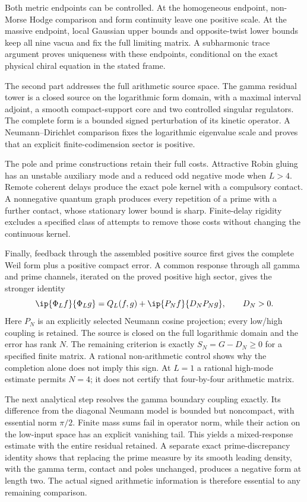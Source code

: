 Both metric endpoints can be controlled. At the homogeneous
endpoint, non-Morse Hodge comparison and form continuity leave
one positive scale. At the massive endpoint, local Gaussian upper
bounds and opposite-twist lower bounds keep all nine vacua and
fix the full limiting matrix. A subharmonic trace argument proves
uniqueness with these endpoints, conditional on the exact
physical chiral equation in the stated frame.

The second part addresses the full arithmetic source space.
The gamma residual tower is a closed source on the logarithmic
form domain, with a maximal interval adjoint, a smooth
compact-support core and two controlled singular regulators.
The complete form is a bounded signed perturbation of its
kinetic operator. A Neumann--Dirichlet comparison fixes the
logarithmic eigenvalue scale and proves that an explicit
finite-codimension sector is positive.

The pole and prime constructions retain their full costs.
Attractive Robin gluing has an unstable auxiliary mode and a
reduced odd negative mode when $L>4$. Remote coherent delays
produce the exact pole kernel with a compulsory contact.
A nonnegative quantum graph produces every repetition of a
prime with a further contact, whose stationary lower bound is
sharp. Finite-delay rigidity excludes a specified class of
attempts to remove those costs without changing the continuous
kernel.

Finally, feedback through the assembled positive source first
gives the complete Weil form plus a positive compact error.
A common response through all gamma and prime channels,
iterated on the proved positive high sector, gives the stronger
identity
\begin{equation}\label{intro:finite-completion}
\ip{\Phi_Lf}{\Phi_Lg}
=Q_L(f,g)+\ip{P_Nf}{D_NP_Ng},\qquad D_N>0.
\end{equation}
Here $P_N$ is an explicitly selected Neumann cosine projection;
every low/high coupling is retained. The source is closed on
the full logarithmic domain and the error has rank $N$.
The remaining criterion is exactly $S_N=G-D_N\ge0$ for a
specified finite matrix. A rational non-arithmetic control
shows why the completion alone does not imply this sign.
At $L=1$ a rational high-mode estimate permits $N=4$; it does
not certify that four-by-four arithmetic matrix.

The next analytical step resolves the gamma boundary coupling
exactly. Its difference from the diagonal Neumann model is bounded
but noncompact, with essential norm $\pi/2$. Finite mass sums fail
in operator norm, while their action on the low-input space has an
explicit vanishing tail. This yields a mixed-response estimate with
the entire residual retained. A separate exact prime-discrepancy
identity shows that replacing the prime measure by its smooth
leading density, with the gamma term, contact and poles unchanged,
produces a negative form at length two. The actual signed arithmetic
information is therefore essential to any remaining comparison.

